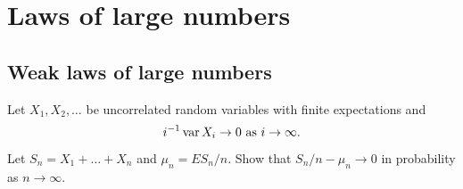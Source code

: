 \documentclass[a4paper]{article}
\author{\nauthor\vspace{5pt}\\
Carnegie Mellon University}
\begin{document}
\maketitle

\tableofcontents

\setcounter{section}{1}

\section{Laws of large numbers}

\setcounter{subsection}{1}

\subsection{Weak laws of large numbers}

\begin{ex}[Durrett 2.2.1]
  Let $X_1, X_2, \dots$ be uncorrelated random variables with
  finite expectations and
  \[
  i^{-1} \operatorname{var} X_i \to 0 \text{ as $i \to \infty$}.
  \]
  Let $S_n = X_1 + \dots + X_n$ and $\mu_n = E S_n / n$. Show that 
  $S_n / n - \mu_n \to 0$ in probability as $n \to \infty$.
\end{ex}
\end{document}
